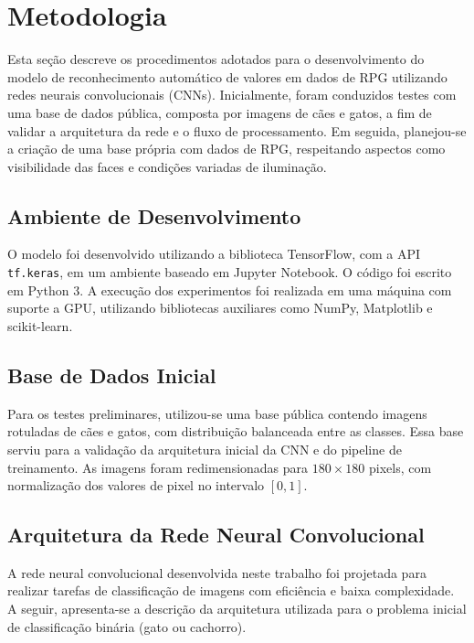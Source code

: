 \section{Metodologia}

Esta seção descreve os procedimentos adotados para o desenvolvimento do modelo de reconhecimento automático de valores em dados de RPG utilizando redes neurais convolucionais (CNNs). Inicialmente, foram conduzidos testes com uma base de dados pública, composta por imagens de cães e gatos, a fim de validar a arquitetura da rede e o fluxo de processamento. Em seguida, planejou-se a criação de uma base própria com dados de RPG, respeitando aspectos como visibilidade das faces e condições variadas de iluminação.

\subsection{Ambiente de Desenvolvimento}

O modelo foi desenvolvido utilizando a biblioteca TensorFlow, com a API \texttt{tf.keras}, em um ambiente baseado em Jupyter Notebook. O código foi escrito em Python 3. A execução dos experimentos foi realizada em uma máquina com suporte a GPU, utilizando bibliotecas auxiliares como NumPy, Matplotlib e scikit-learn.

\subsection{Base de Dados Inicial}

Para os testes preliminares, utilizou-se uma base pública contendo imagens rotuladas de cães e gatos, com distribuição balanceada entre as classes. Essa base serviu para a validação da arquitetura inicial da CNN e do pipeline de treinamento. As imagens foram redimensionadas para $180 \times 180$ pixels, com normalização dos valores de pixel no intervalo $[0, 1]$.

\subsection{Arquitetura da Rede Neural Convolucional}

A rede neural convolucional desenvolvida neste trabalho foi projetada para realizar tarefas de classificação de imagens com eficiência e baixa complexidade. A seguir, apresenta-se a descrição da arquitetura utilizada para o problema inicial de classificação binária (gato ou cachorro).

